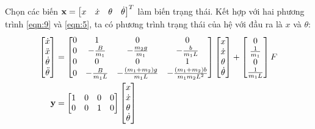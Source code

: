 \documentclass[12pt,a4paper]{article}
\begin{document}
Chọn các biến $\vb x = \begin{bmatrix}
    x & \dot x & \theta & \dot\theta 
\end{bmatrix}^T$ làm biến trạng thái. Kết hợp với hai phương trình \eqref{eqn:9} và \eqref{eqn:5}, ta có phương trình trạng thái của hệ với đầu ra là $x$ và $\theta$:
\begin{align}
    \begin{bmatrix}
        \dot x \\ \ddot x \\ \dot \theta \\ \ddot\theta 
    \end{bmatrix} & = \begin{bmatrix}
        0 & 1 & 0 & 0 \\
        0 & -\frac{B}{m_1} & -\frac{m_2g}{m_1} & -\frac{b}{m_1L}\\
        0 & 0 & 0 & 1 \\
        0 & -\frac{B}{m_1L} & -\frac{(m_1+m_2)g}{m_1L} & -\frac{(m_1+m_2)b}{m_1m_2L^2}
    \end{bmatrix}\begin{bmatrix}
        x \\ \dot x \\ \theta \\ \dot\theta 
    \end{bmatrix} + \begin{bmatrix}
        0 \\ \frac{1}{m_1} \\ 0 \\ \frac{1}{m_1L}
    \end{bmatrix}F\label{eqn:11}\\
    \vb y & = \begin{bmatrix}
        1 & 0 & 0 & 0\\
        0 & 0 & 1 & 0
    \end{bmatrix}\begin{bmatrix}
        x \\ \dot x \\ \theta \\ \dot\theta 
    \end{bmatrix}\label{eqn:12}
\end{align}

\newpage
\end{document}
